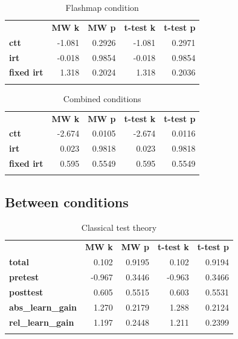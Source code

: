 \begin{longtable}[c]{@{}lrrrr@{}}
\caption{Flashmap condition}
\endfirsthead
\endhead
\toprule\addlinespace
& \textbf{MW k} & \textbf{MW p} &
\textbf{t-test k} & \textbf{t-test p}
\\\addlinespace
\midrule
\textbf{ctt} & -1.081 & 0.2926 & -1.081 & 0.2971
\\\addlinespace
\textbf{irt} & -0.018 & 0.9854 & -0.018 & 0.9854
\\\addlinespace
\textbf{fixed irt} & 1.318 & 0.2024 & 1.318 & 0.2036
\\\addlinespace
\bottomrule
    \label{tab:comp_pp_fm_comp}
\end{longtable}

\begin{longtable}[c]{@{}lrrrr@{}}
\caption{Combined conditions}
\endfirsthead
\endhead
\toprule\addlinespace
& \textbf{MW k} & \textbf{MW p} &
\textbf{t-test k} & \textbf{t-test p}
\\\addlinespace
\midrule
\textbf{ctt} & -2.674 & 0.0105 & -2.674 & 0.0116
\\\addlinespace
\textbf{irt} & 0.023 & 0.9818 & 0.023 & 0.9818
\\\addlinespace
\textbf{fixed irt} & 0.595 & 0.5549 & 0.595 & 0.5549
\\\addlinespace
\bottomrule
    \label{tab:comp_pp_gen_comp}
\end{longtable}

\FloatBarrier
\subsection{Between conditions}

\begin{longtable}[c]{@{}lrrrr@{}}
\caption{Classical test theory}
\endfirsthead
\endhead
\toprule\addlinespace
& \textbf{MW k} & \textbf{MW p} &
\textbf{t-test k} & \textbf{t-test p}
\\\addlinespace
\midrule
\textbf{total} & 0.102 & 0.9195 & 0.102 & 0.9194
\\\addlinespace
\textbf{pretest} & -0.967 & 0.3446 & -0.963 & 0.3466
\\\addlinespace
\textbf{posttest} & 0.605 & 0.5515 & 0.603 & 0.5531
\\\addlinespace
\textbf{abs\_learn\_gain} & 1.270 & 0.2179 & 1.288 & 0.2124
\\\addlinespace
\textbf{rel\_learn\_gain} & 1.197 & 0.2448 & 1.211 & 0.2399
\\\addlinespace
\bottomrule
    \label{tab:comp_cond_ctt_comp}
\end{longtable}

